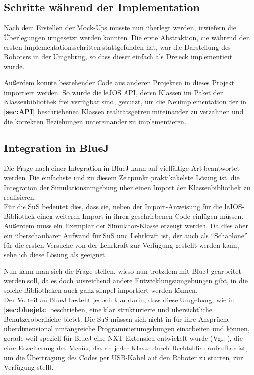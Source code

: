 \documentclass[paper=a4, pagesize, DIV=calc, BCOR=15.5mm, twoside=on, onecolumn=on, open = right, titlepage =on, parskip =half-, headsepline = on, footsepline = on, chapterprefix = on, appendixprefix = off, fontsize = 12pt, numbers = noenddot, abstract = on]{scrbook}
\numberwithin{equation}{chapter}
\theoremstyle{definition}
\theoremstyle{plain}
\theoremstyle{plain}
\theoremstyle{remark}
\theoremstyle{plain}
\theoremstyle{plain}
\begin{document}
\subsection{Schritte während der Implementation}
\onehalfspacing
Nach dem Erstellen der Mock-Ups musste nun überlegt werden, inwiefern die Überlegungen umgesetzt werden konnten. Die erste Abstraktion, die während den ersten Implementationsschritten stattgefunden hat, war die Darstellung des Roboters in der Umgebung, so dass dieser einfach als Dreieck implementiert wurde.

Außerdem konnte bestehender Code aus anderen Projekten in dieses Projekt importiert werden. So wurde die leJOS API, deren Klassen im Paket der Klassenbibliothek frei verfügbar sind, genutzt, um die Neuimplementation der in \textbf{\ref{sec:API}} beschriebenen Klassen realitätsgetreu miteinander zu verzahnen und die korrekten Beziehungen untereinander zu implementieren.

\par \singlespacing
\subsection{Integration in BlueJ}
\label{sec:integration}
\onehalfspacing
Die Frage nach einer Integration in BlueJ kann auf vielfältige Art beantwortet werden. Die einfachste und zu diesem Zeitpunkt praktikabelste Lösung ist, die Integration der Simulationsumgebung über einen Import der Klassenbibliothek zu realisieren.\\
Für die SuS bedeutet dies, dass sie, neben der Import-Anweisung für die leJOS-Bibliothek einen weiteren Import in ihren geschriebenen Code einfügen müssen. Außerdem muss ein Exemplar der Simulator-Klasse erzeugt werden. Da dies aber ein überschaubarer Aufwand für SuS und Lehrkraft ist, der auch als "`Schablone"' für die ersten Versuche von der Lehrkraft zur Verfügung gestellt werden kann, sehe ich diese Lösung als geeignet.

Nun kann man sich die Frage stellen, wieso nun trotzdem mit BlueJ gearbeitet werden soll, da es doch ausreichend andere Entwicklungsumgebungen gibt, in die solche Bibliotheken auch ganz simpel importiert werden können.\\
Der Vorteil an BlueJ besteht jedoch klar darin, dass diese Umgebung, wie in \textbf{\ref{sec:bluejetc}} beschrieben, eine klar strukturierte und übersichtliche Benutzeroberfläche bietet. Die SuS müssen sich nicht in für ihre Ansprüche überdimensional umfangreiche Programmierumgebungen einarbeiten und können, gerade weil speziell für BlueJ eine NXT-Extension entwickelt wurde (Vgl. \cite{bowes:12}), die eine Erweiterung des Menüs, das an jeder Klasse durch Rechtsklick aufrufbar ist, um die Übertragung des Codes per USB-Kabel auf den Roboter zu starten, zur Verfügung stellt.
\end{document}
